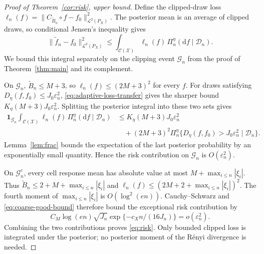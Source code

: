 \documentclass[11pt,a4paper]{article}
\theoremstyle{remark}
\newcommand{\Xcal}{\mathcal X}
\newcommand{\Dcal}{\mathcal D}
\newcommand{\Lcal}{\mathcal L}
\newcommand{\Ccal}{\mathcal C}
\newcommand{\norm}[1]{\lVert#1\rVert}
\begin{document}
\begingroup
\begin{proof}[Proof of Theorem~\ref{cor:risk}, upper bound]
Define the clipped-draw loss
$\ell_n(f)=\norm{C_{\widetilde B_n}\circ f-f_0}_{\Lcal^2(P_X)}^2$.
The posterior mean is an average of clipped draws, so conditional
Jensen's inequality gives
\[
\norm{\widetilde f_n-f_0}_{\Lcal^2(P_X)}^2
\leq\int_{\Ccal(\Xcal)}\ell_n(f)\,
\Pi_n^\eta(\mathrm d f\mid\Dcal_n).
\]
We bound this integral separately on the clipping event
$\mathcal G_n$ from the proof of Theorem~\ref{thm:main} and its
complement.

On $\mathcal G_n$, $\widetilde B_n\leq M+3$, so
$\ell_n(f)\leq(2M+3)^2$ for every $f$.
For draws satisfying $D_\eta(f,f_0)\leq J_0\varepsilon_n^2$,
\eqref{eq:adaptive-loss-transfer} gives the sharper bound
$K_\eta(M+3)J_0\varepsilon_n^2$.
Splitting the posterior integral into these two sets gives
\begin{equation}
\begin{split}
\mathbf1_{\mathcal G_n}\int_{\Ccal(\Xcal)}\ell_n(f)\,
\Pi_n^\eta(\mathrm d f\mid\Dcal_n)
&\leq K_\eta(M+3)J_0\varepsilon_n^2\\
&\quad +(2M+3)^2\Pi_n^\eta
\{D_\eta(f,f_0)>J_0\varepsilon_n^2\mid\Dcal_n\}.
\end{split}
\end{equation}
Lemma~\ref{lem:frac} bounds the expectation of the last posterior
probability by an exponentially small quantity. Hence the risk
contribution on $\mathcal G_n$ is $O(\varepsilon_n^2)$.

On $\mathcal G_n^c$, every cell response mean has absolute value
at most $M+\max_{i\leq n}|\xi_i|$. Thus
$\widetilde B_n\leq2+M+\max_{i\leq n}|\xi_i|$ and
$\ell_n(f)\leq(2M+2+\max_{i\leq n}|\xi_i|)^2$.
The fourth moment of $\max_{i\leq n}|\xi_i|$ is
$O(\log^2(en))$. Cauchy--Schwarz and
\eqref{eq:coarse-good-bound} therefore bound the exceptional
risk contribution by
\[
C_M\log(en)\sqrt{J_n}\exp\{-c_Xn/(16J_n)\}
=o(\varepsilon_n^2).
\]
Combining the two contributions proves \eqref{eq:risk}.
Only bounded clipped loss is integrated under the posterior;
no posterior moment of the R\'enyi divergence is needed.
\end{proof}
\endgroup
\end{document}
